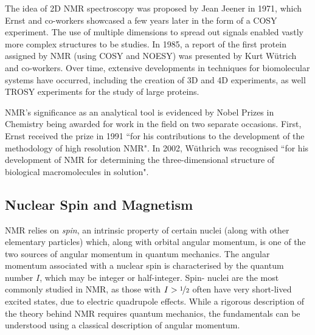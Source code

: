 The idea of 2D NMR spectroscopy was proposed by Jean Jeener in
1971\cite{Jeener1971, Jeener2016}, which Ernst and co-workers showcased a few
years later in the form of a \ac{COSY} experiment\cite{Aue1976}. The use of
multiple dimensions to spread out signals enabled vastly more complex
structures to be studies. In 1985, a report of the first protein assigned by
\ac{NMR} (using \ac{COSY} and \ac{NOESY}) was presented by Kurt W\"utrich and
co-workers\cite{Williamson1985}. Over time, extensive developments in
techniques for biomolecular systems have occurred, including the creation of 3D
and 4D experiments\cite{Marion1989, Kay1990}, as well \ac{TROSY}
experiments\cite{Pervushin1997} for the study of large proteins.

\ac{NMR}'s significance as an analytical tool is evidenced by Nobel Prizes in
Chemistry being awarded for work in the field on two separate occasions. First,
Ernst received the prize in 1991 ``for his contributions to the development of
the methodology of high resolution \acl{NMR}"\cite{Ernst1992}. In 2002,
W\"uthrich was recognised ``for his development of \acl{NMR} for determining
the three-dimensional structure of biological macromolecules in
solution"\cite{Wuthrich2003}.

\subsection{Nuclear Spin and Magnetism}
\ac{NMR} relies on \textit{spin}, an intrinsic property of certain nuclei
(along with other elementary particles) which, along with orbital angular
momentum, is one of the two sources of angular momentum in quantum mechanics.
The angular momentum associated with a nuclear spin is characterised by the
quantum number $I$, which may be integer or half-integer. Spin-
nuclei are the most commonly studied in \ac{NMR}, as those with $I >
\nicefrac{1}{2}$ often have very short-lived excited states, due to electric
quadrupole effects. While a rigorous description of  the theory behind \ac{NMR}
requires quantum mechanics\cite{Abragam1961,Goldman1988,Cavanagh2007}, the
fundamentals can be understood using a classical description of angular
momentum.

